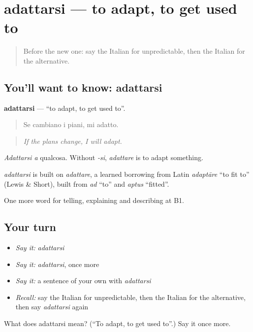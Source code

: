 \section[adattarsi]{adattarsi — to adapt, to get used to}

\label{lesson:IT-C374-adattarsi}



\begin{quote}
Before the new one: say the Italian for unpredictable, then the Italian for the alternative.
\end{quote}

\subsection*{You'll want to know: adattarsi}
\textbf{adattarsi} — \textquotedblleft{}to adapt, to get used to\textquotedblright{}.

\begin{quote}
Se cambiano i piani, mi adatto.
\end{quote}

\begin{quote}
\emph{If the plans change, I will adapt.}
\end{quote}

\emph{Adattarsi a} qualcosa. Without \emph{-si}, \emph{adattare} is to adapt something.

\begin{cousinweb}
\emph{adattarsi} is built on \emph{adattare}, a learned borrowing from Latin \emph{adaptāre} \textquotedblleft{}to fit to\textquotedblright{} (Lewis \& Short), built from \emph{ad} \textquotedblleft{}to\textquotedblright{} and \emph{aptus} \textquotedblleft{}fitted\textquotedblright{}.
\end{cousinweb}

\begin{grammarlens}[title={What you've built}]
One more word for telling, explaining and describing at B1.
\end{grammarlens}

\subsection*{Your turn}
\begin{itemize}
\raggedright
  \item \emph{Say it:} \emph{adattarsi}
  \item \emph{Say it:} \emph{adattarsi}, once more
  \item \emph{Say it:} a sentence of your own with \emph{adattarsi}
  \item \emph{Recall:} say the Italian for unpredictable, then the Italian for the alternative, then say \emph{adattarsi} again
\end{itemize}

\begin{tcolorbox}[breakable,colback=teal!4,colframe=teal!35!black,title={Before you move on}]
What does adattarsi mean? (\textquotedblleft{}To adapt, to get used to\textquotedblright{}.) Say it once more.
\end{tcolorbox}
